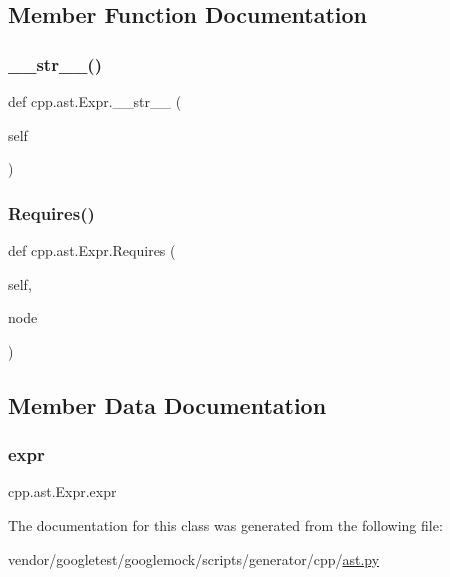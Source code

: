 \subsection{Member Function Documentation}
\mbox{\label{classcpp_1_1ast_1_1_expr_a7ee1896fbfa7819adbd0b2f89d11ecec}} 
\subsubsection{\texorpdfstring{\+\_\+\+\_\+str\+\_\+\+\_\+()}{\_\_str\_\_()}}
{\footnotesize\ttfamily def cpp.\+ast.\+Expr.\+\_\+\+\_\+str\+\_\+\+\_\+ (\begin{DoxyParamCaption}\item[{}]{self }\end{DoxyParamCaption})}

\mbox{\label{classcpp_1_1ast_1_1_expr_a9c92416eb1285068f190dcda8fd33682}} 
\subsubsection{\texorpdfstring{Requires()}{Requires()}}
{\footnotesize\ttfamily def cpp.\+ast.\+Expr.\+Requires (\begin{DoxyParamCaption}\item[{}]{self,  }\item[{}]{node }\end{DoxyParamCaption})}



\subsection{Member Data Documentation}
\mbox{\label{classcpp_1_1ast_1_1_expr_a2f4e13fb0176f2616f8703103c806462}} 
\subsubsection{\texorpdfstring{expr}{expr}}
{\footnotesize\ttfamily cpp.\+ast.\+Expr.\+expr}



The documentation for this class was generated from the following file\+:\begin{DoxyCompactItemize}
\item 
vendor/googletest/googlemock/scripts/generator/cpp/\hyperlink{ast_8py}{ast.\+py}\end{DoxyCompactItemize}
